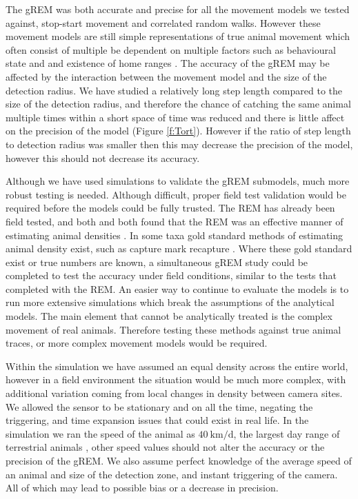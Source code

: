 \documentclass[a4paper,10pt,reqno,oneside]{amsart}
\begin{document}
The gREM was both accurate and precise for all the movement models we tested against, stop-start movement and correlated random walks. However these movement models are still simple representations of true animal movement which often consist of multiple be dependent on multiple factors such as behavioural state and and existence of home ranges \citep{smouse2010stochastic}. The accuracy of the gREM may be affected by the interaction between the movement model and the size of the detection radius. We have studied a relatively long step length compared to the size of the detection radius, and therefore the chance of catching the same animal multiple times within a short space of time was reduced and there is little affect on the precision of the model (Figure \ref{f:Tort}). However if the ratio of step length to detection radius was smaller then this may decrease the precision of the model, however this should not decrease its accuracy. 

Although we have used simulations to validate the gREM submodels, much more robust testing is needed. Although difficult, proper field test validation would be required before the models could be fully trusted. The REM \citep{rowcliffe2008estimating} has already been field tested, and both \citet{rowcliffe2008estimating} and \citet{zero2013monitoring} both found that the REM was an effective manner of estimating animal densities \citep{rowcliffe2008estimating, zero2013monitoring}. In some taxa gold standard methods of estimating animal density exist, such as capture mark recapture \citep{sollmann2013using}. Where these gold standard exist or true numbers are known, a simultaneous gREM study could be completed to test the accuracy under field conditions, similar to the tests that \citet{rowcliffe2008estimating} completed with the REM. An easier way to continue to evaluate the models is to run more extensive simulations which break the assumptions of the analytical models. The main element that cannot be analytically treated is the complex movement of real animals. Therefore testing these methods against true animal traces, or more complex movement models would be required.

Within the simulation we have assumed an equal density across the entire world, however in a field environment the situation would be much more complex, with additional variation coming from local changes in density between camera sites. We allowed the sensor to be stationary and on all the time, negating the triggering, and time expansion issues that could exist in real life. In the simulation we ran the speed of the animal as  $\SI{40}{\kilo\meter \per \day}$, the largest day range of terrestrial animals \citep{carbone2005far}, other speed values should not alter the accuracy or the precision of the gREM. We also assume perfect knowledge of the average speed of an animal and size of the detection zone, and instant triggering of the camera. All of which may lead to possible bias or a decrease in precision. 
\end{document}
